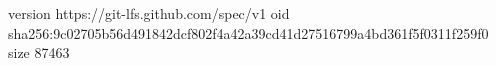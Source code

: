 version https://git-lfs.github.com/spec/v1
oid sha256:9c02705b56d491842dcf802f4a42a39cd41d27516799a4bd361f5f0311f259f0
size 87463
